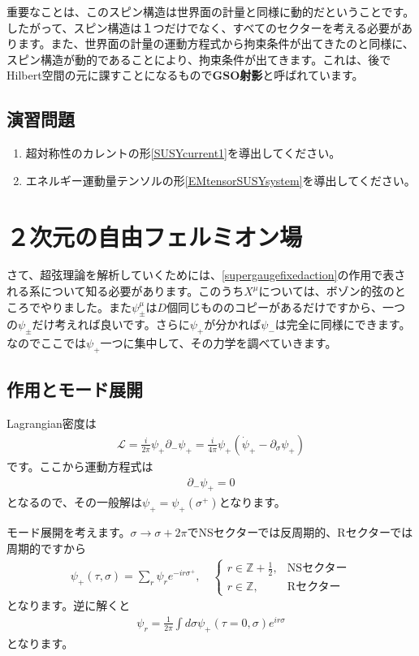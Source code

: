 \documentclass[report,paper=a4, fontsize=12pt, line_length=16cm, number_of_lines=34,dvipdfmx]{jlreq}
\numberwithin{equation}{chapter}
\numberwithin{equation}{section}
\newcommand{\Zb}{\mathbb{Z}}
\newcommand{\del}{\partial}
\newcommand{\kyou}[1]{{\sffamily \bfseries #1}}
\newcommand{\Lcal}{\mathcal{L}}
\begin{document}
重要なことは、このスピン構造は世界面の計量と同様に動的だということです。したがって、スピン構造は１つだけでなく、すべてのセクターを考える必要があります。また、世界面の計量の運動方程式から拘束条件が出てきたのと同様に、スピン構造が動的であることにより、拘束条件が出てきます。これは、後でHilbert空間の元に課すことになるもので\kyou{GSO射影}と呼ばれています。

\subsection*{演習問題}
\begin{enumerate}
  \item 超対称性のカレントの形\eqref{SUSYcurrent1}を導出してください。
  \item エネルギー運動量テンソルの形\eqref{EMtensorSUSYsystem}を導出してください。
\end{enumerate}

\section{２次元の自由フェルミオン場}
\label{sec:fermion}
さて、超弦理論を解析していくためには、\eqref{supergaugefixedaction}の作用で表される系について知る必要があります。このうち$X^{\mu}$については、ボゾン的弦のところでやりました。また$\psi^{\mu}_{\pm}$は$D$個同じもののコピーがあるだけですから、一つの$\psi_{\pm}$だけ考えれば良いです。さらに$\psi_{+}$が分かれば$\psi_{-}$は完全に同様にできます。なのでここでは$\psi_{+}$一つに集中して、その力学を調べていきます。

\subsection{作用とモード展開}
Lagrangian密度は
\begin{align}
  \Lcal=\frac{i}{2\pi}\psi_{+}\del_{-}\psi_{+}=\frac{i}{4\pi}\psi_{+}(\dot{\psi}_{+}-\del_{\sigma}\psi_{+})\label{MWfermionaction}
\end{align}
です。ここから運動方程式は
\begin{align}
  \del_{-}\psi_{+}=0
\end{align}
となるので、その一般解は$\psi_{+}=\psi_{+}(\sigma^{+})$となります。

モード展開を考えます。$\sigma\to\sigma+2\pi$でNSセクターでは反周期的、Rセクターでは周期的ですから
\begin{align}
  \psi_{+}(\tau,\sigma)=\sum_{r} \psi_{r} e^{-ir\sigma^{+}},\quad
  \begin{cases}
    r\in \Zb+\frac12,&\text{NSセクター}\\
    r\in \Zb,&\text{Rセクター}
  \end{cases}
  \label{psimodeexp}
\end{align}
となります。逆に解くと
\begin{align}
  \psi_{r}=\frac{1}{2\pi}\int d\sigma \psi_{+}(\tau=0,\sigma)e^{ir\sigma}
\end{align}
となります。
\end{document}
